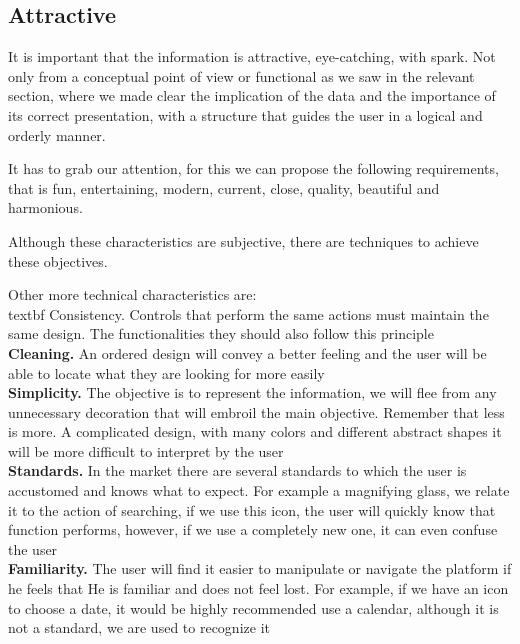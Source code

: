 \subsection{Attractive}
It is important that the information is attractive, eye-catching, with spark. Not only from a conceptual point of view
or functional as we saw in the relevant section, where we made clear the implication of the data and the importance
of its correct presentation, with a structure that guides the user in a logical and orderly manner.

It has to grab our attention, for this we can propose the following requirements, that is fun, entertaining,
modern, current, close, quality, beautiful and harmonious.

Although these characteristics are subjective, there are techniques to achieve these objectives.

Other more technical characteristics are: \\
textbf {Consistency.} Controls that perform the same actions must maintain the same design. The functionalities
they should also follow this principle \\

\textbf{Cleaning.} An ordered design will convey a better feeling and the user will be able to locate what they are looking for
more easily\\

\textbf{Simplicity.} The objective is to represent the information, we will flee from any unnecessary decoration that will embroil
the main objective. Remember that less is more. A complicated design, with many colors and different abstract shapes
it will be more difficult to interpret by the user \\


\textbf{Standards.} In the market there are several standards to which the user is accustomed and knows what to expect.
For example a magnifying glass, we relate it to the action of searching, if we use this icon, the user will quickly know that
function performs, however, if we use a completely new one, it can even confuse the user \\

\textbf{Familiarity.} The user will find it easier to manipulate or navigate the platform if he feels that
He is familiar and does not feel lost. For example, if we have an icon to choose a date, it would be highly recommended
use a calendar, although it is not a standard, we are used to recognize it \\

